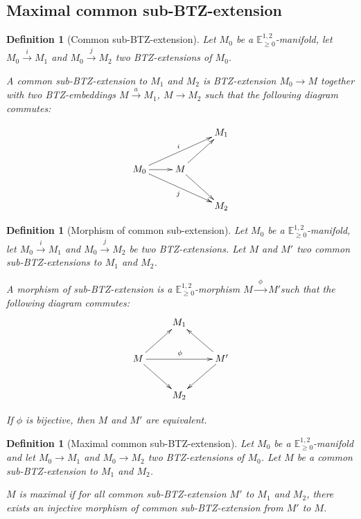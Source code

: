 \documentclass[a4paper,12pt]{article}
\newcommand{\mass}[1]{{\mathbb E}^{1,2}_{#1}}
\newtheorem{defou}[lemou]{Definition}    %
\begin{document}
		
		\subsection{Maximal common sub-BTZ-extension}
		\begin{defou}[Common sub-BTZ-extension]\label{btzdef:common_sub_btz_extension} Let $M_0$ be a $\mass{\geq0}$-mani\-fold, let $M_0\xrightarrow{i} M_1$ and  $M_0 \xrightarrow{j} M_2$
			two BTZ-extensions of $M_0$.
			
			A common sub-BTZ-extension to $M_1$ and $M_2$ is BTZ-extension  $M_0\rightarrow M$  together with two BTZ-embeddings $M\xrightarrow{a} M_1$, $M \rightarrow M_2$ such that the following diagram commutes:
			
			$$
				\xymatrix{
					& &M_1\\
					M_0\ar[urr]^i \ar[drr]_j\ar[r]&M\ar[ur]\ar[dr]& \\
					&& M_2
				}		
			$$
		
		\end{defou}
		
		\begin{defou}[Morphism of common sub-extension]\label{btzdef:morphism_common_sub_extension}
			Let $M_0$ be a $\mass{\geq0}$-manifold, let $M_0\xrightarrow{i} M_1$ and $M_0 \xrightarrow{j} M_2$
			be two BTZ-extensions. Let $M$ and $M'$ two common sub-BTZ-extensions to $M_1$ and $M_2$.
			
			A morphism of sub-BTZ-extension is a $\mass{\geq0}$-morphism $M\xrightarrow{~~\phi~~} M'$such that the following diagram commutes:
			$$
				\xymatrix{
					 &M_1 &\\
					M\ar[ur]\ar[dr]\ar[rr]^\phi& &M'\ar[ul]\ar[dl]\\
					& M_2 &
				}		
			$$
			
			If $\phi$ is bijective, then $M$ and $M'$ are equivalent. 	
		\end{defou}
		\begin{defou}[Maximal common sub-BTZ-extension]\label{btzdef:maximal_common_sub_btz_extension}
				Let $M_0$ be a $\mass{\geq0}$-manifold and let $M_0\xrightarrow{} M_1$ and $M_0 \xrightarrow{} M_2$
			two BTZ-extensions  of $M_0$. Let $M$ be a common sub-BTZ-extension to $M_1$ and $M_2$.
			
			$M$ is maximal if for all common sub-BTZ-extension $M'$ to $M_1$ and $M_2$,  there exists an injective morphism of common sub-BTZ-extension from $M'$ to $M$.
		\end{defou}
\end{document}
